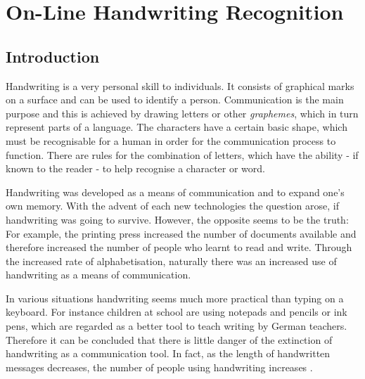 ﻿%

\chapter{On-Line Handwriting Recognition}
\label{chap:onlinehwr}



\section{Introduction}
\label{sec:onlinehwrintroduction}


Handwriting is a very personal skill to individuals. It consists of graphical
marks on a surface and can be used to identify a person. Communication is the main purpose and this is achieved by drawing letters or other 
\emph{graphemes}, which in turn represent parts of a language.
The characters have a certain basic shape, which must be recognisable
for a human in order for the communication process to function.
There are rules for the combination of letters, which have the ability - if
known to the reader - to help recognise a character or word.

Handwriting was developed as a means of communication and to expand one's own
memory. With the advent of each new technologies the question arose, 
if handwriting was going to survive. However, the opposite seems to be the 
truth: For example, the printing press increased the number of documents
available and therefore increased the number of people who learnt to read
and write. Through the increased rate of alphabetisation, naturally there was
an increased use of handwriting as a means of communication.

In various situations handwriting seems much more practical than typing on a
keyboard. For instance children at school are using notepads and pencils or
ink pens, which are regarded as a better tool to teach writing by German 
teachers. Therefore it can be concluded that there is little danger of
the extinction of handwriting as a communication tool. In fact, as 
the length of handwritten messages decreases, the number of people using 
handwriting increases .

